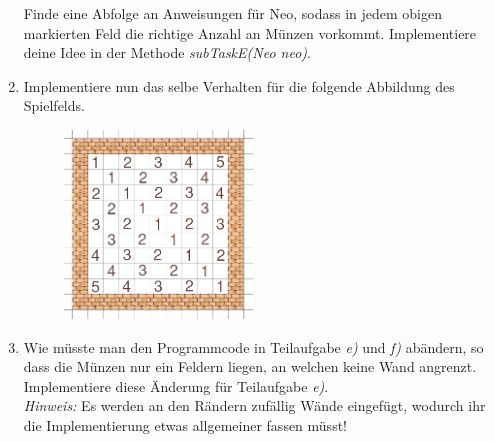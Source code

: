 \begin{enumerate}[label=\alph*)]
\begin{figure}[h!]
    \end{figure}\newline
    Finde eine Abfolge an Anweisungen für Neo, sodass in jedem obigen markierten Feld die richtige Anzahl an Münzen vorkommt. Implementiere deine Idee
    in der Methode \textit{subTaskE(Neo neo)}.
    \newpage
    \item Implementiere nun das selbe Verhalten für die folgende Abbildung des Spielfelds.\\
    \begin{figure}[h!]
        \centering
        \includegraphics[height=5cm]{figures/ex05f1.png}
    \end{figure}\newline
    \item Wie müsste man den Programmcode in Teilaufgabe \textit{e)} und \textit{f)} abändern, so dass die Münzen nur ein Feldern liegen, an welchen 
    keine Wand angrenzt. Implementiere diese Änderung für Teilaufgabe \textit{e)}.\\
    \textit{Hinweis:} Es werden an den Rändern zufällig Wände eingefügt, wodurch ihr die Implementierung etwas allgemeiner fassen müsst!
\end{enumerate}